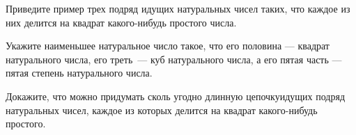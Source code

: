 ﻿
\begin{itemize}

\itA Приведите пример трех подряд идущих натуральных чисел таких, что каждое из них делится на квадрат какого-нибудь простого числа.

\itB Укажите наименьшее натуральное число такое, что его половина — квадрат натурального числа, его треть~— куб натурального числа, а его пятая часть — пятая степень натурального числа.

\itC Докажите, что можно придумать сколь угодно длинную цепочку\linebreak идущих подряд натуральных чисел, каждое из которых делится на квадрат какого-нибудь простого.
\end{itemize}